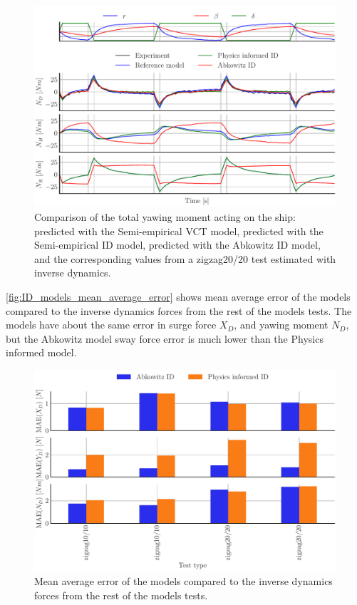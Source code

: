 \begin{figure}[h]
    \includegraphics[width=\columnwidth]{figures/result_ID_regression.ID_regression_ID_N.pdf}
    \caption{Comparison of the total yawing moment acting on the ship: predicted with the Semi-empirical VCT model, predicted with the Semi-empirical ID model, predicted with the Abkowitz ID model, and the corresponding values from a zigzag20/20 test estimated with inverse dynamics.}
    \label{fig:ID_regression_ID_N}
\end{figure}
\autoref{fig:ID_models_mean_average_error} shows mean average error of the models compared to the inverse dynamics
forces from the rest of the models tests. The models have about the same error in surge force $X_D$, and yawing moment $N_D$, but the Abkowitz model sway force error is much lower than the Physics informed model. 
\begin{figure}[h]
    \begin{center}
        \includegraphics[width=\columnwidth]{figures/result_ID_regression.ID_models_mean_average_error.pdf}
        \caption{Mean average error of the models compared to the inverse dynamics
forces from the rest of the models tests.}
        \label{fig:ID_models_mean_average_error}
    \end{center}
\end{figure}

